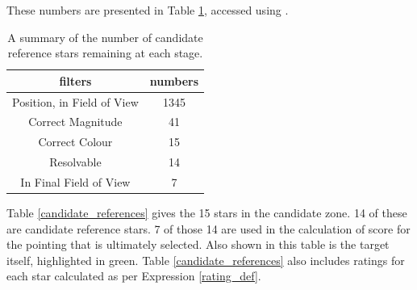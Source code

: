 \documentclass[referee]{aa}
\begin{document}
These numbers are presented in Table \ref{summary_of_references}, accessed using \citet{rcurl}. 

\begin{table}[!htb]
\centering
\begin{tabular}{cc}
\hline\hline
filters & numbers\\
\hline
Position, in Field of View & 1345\\
Correct Magnitude & 41\\
Correct Colour & 15\\
Resolvable & 14\\
In Final Field of View & 7\\
\hline
\end{tabular}
\caption{\label{summary_of_references}A summary of the number of candidate reference stars remaining at each stage.}
\end{table}


Table \ref{candidate_references} gives the 15 stars in the candidate zone.  14 of these are candidate reference stars.  7 of those 14 are used in the calculation of score for the pointing that is ultimately selected.  Also shown in this table is the target itself, highlighted in green. Table \ref{candidate_references} also includes ratings for each star calculated as per Expression \ref{rating_def}.
\end{document}
